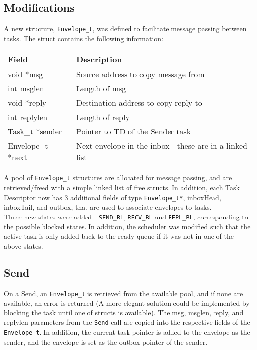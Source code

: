 \documentclass[12pt]{article}
\begin{document}
\subsection{Modifications}
A new structure, \texttt{Envelope\_t}, was defined to facilitate message passing between tasks. The struct contains the following information:
\begin{center}
  \begin{tabular}{|l|l|}
    \hline
    {\bf Field} & {\bf Description} \\\hline
    void *msg & Source address to copy message from \\\hline
    int msglen & Length of msg \\\hline
    void *reply & Destination address to copy reply to \\\hline
    int replylen & Length of reply \\\hline
    Task\_t *sender & Pointer to TD of the Sender task \\\hline
    Envelope\_t *next & Next envelope in the inbox - these are in a linked list \\\hline
  \end{tabular}
\end{center}
A pool of \texttt{Envelope\_t} structures are allocated for message passing, and are retrieved/freed with a simple linked list of free structs. In addition, each Task Descriptor now has 3 additional fields of type \texttt{Envelope\_t*}, inboxHead, inboxTail, and outbox, that are used to associate envelopes to tasks.
\\
Three new states were added - \texttt{SEND\_BL}, \texttt{RECV\_BL} and \texttt{REPL\_BL}, corresponding to the possible blocked states. In addition, the scheduler was modified such that the active task is only added back to the ready queue if it was not in one of the above states.

\subsection{Send}
On a Send, an \texttt{Envelope\_t} is retrieved from the available pool, and if none are available, an error is returned (A more elegant solution could be implemented by blocking the task until one of structs is available). The msg, msglen, reply, and replylen parameters from the \texttt{Send} call are copied into the respective fields of the \texttt{Envelope\_t}. In addition, the current task pointer is added to the envelope as the sender, and the envelope is set as the outbox pointer of the sender.
\end{document}
